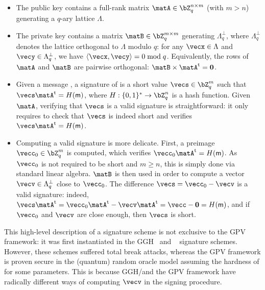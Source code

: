 \begin{itemize}
 \item 
 The public key contains a full-rank matrix $\matA \in \bZ_q^{n \times m}$ (with $m>n$) generating a $q$-ary lattice $\Lambda$.
 \item
 The private key contains a matrix $\matB \in \bZ_q^{m \times m}$ generating $\Lambda_q^\perp$, where $\Lambda_q^\perp$ denotes the lattice orthogonal to $\Lambda$ modulo $q$: for any $\vecx \in \Lambda$ and $\vecy \in \Lambda_q^\perp$, we have $\inner{\vecx}{\vecy} = 0 \bmod q$. Equivalently, the rows of $\matA$ and $\matB$ are pairwise orthogonal: $\matB \times \matA^\t = \matzero$.
 \item Given a message \msg, a signature of \msg is a short value $\vecs \in \bZ_q^m$ such that $\vecs \matA^\t = H(\msg)$, where $H : \{0,1\}^\ast \rightarrow \bZ_q^n$ is a hash function. Given $\matA$, verifying that $\vecs$ is a valid signature is straightforward: it only requires to check that $\vecs$ is indeed short and verifies $\vecs \matA^\t = H(\msg)$.
 \item Computing a valid signature is more delicate. First, a preimage $\vecc_0 \in \bZ_q^m$ is computed, which verifies $\vecc_0 \matA^\t = H(\msg)$.
 As $\vecc_0$ is not required to be short and $m \geq n$, this is simply done via standard linear algebra. $\matB$ is then used in order to compute a vector $\vecv \in \Lambda_q^\perp$ close to $\vecc_0$.
 The difference $\vecs = \vecc_0 - \vecv$ is a valid signature: indeed, $\vecs \matA^\t = \vecc_0 \matA^\t - \vecv \matA^\t = \vecc - \matzero = H(\msg)$, and if $\vecc_0$ and $\vecv$ are close enough, then $\vecs$ is short.
\end{itemize}

This high-level description of a signature scheme is not exclusive to the GPV framework: it was first instantiated in the GGH~\cite{C:GolGolHal97b} and \ntrusign~\cite{RSA:HHPSW03} signature schemes. However, these schemes suffered total break attacks, whereas the GPV framework is proven secure in the (quantum) random oracle model assuming the hardness of \sis for some parameters. This is because GGH/\ntrusign and the GPV framework have radically different ways of computing $\vecv$ in the signing procedure.

